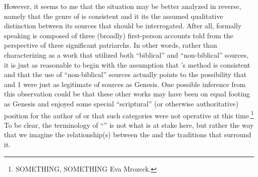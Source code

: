 However, it seems to me that the situation may be better analyzed in reverse, namely that the genre of \ga is consistent and it its the assumed qualitative distinction between its sources that should be interrogated. After all, formally speaking \ga is composed of three (broadly) first-person accounts told from the perspective of three significant patriarchs. In other words, rather than characterizing \ga as a work that utilized both ``biblical'' and ``non-biblical'' sources, it is just as reasonable to begin with the assumption that \ga's method is consistent and that the use of ``non-biblical'' sources actually points to the possibility that \jub and 1 \enoch were just as legitimate of sources as Genesis. One possible inference from this observation could be that these other works may have been on equal footing as Genesis and enjoyed some special ``scriptural'' (or otherwise authoritative) position for the author of \ga or that such categories were not operative at this time.\footnote{SOMETHING, SOMETHING Eva Mrozeck.} To be clear, the terminology of ``\rwb'' is not what is at stake here, but rather the way that we imagine the relationship(s) between the \ga and the traditions that surround it.

